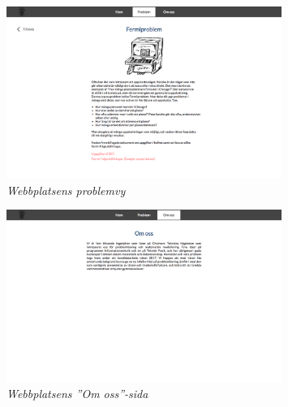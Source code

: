 \begin{figure}
\centering
\includegraphics[width=0.8\textwidth]{Figures/Webbplatsen/Webbplats-problemvy.png}
\caption{\textsl{Webbplatsens problemvy}}
\label{fig:w3}
\end{figure}

\begin{figure}
\centering
\includegraphics[width=0.8\textwidth]{Figures/Webbplatsen/Webbplats-omoss.png}
\caption{\textsl{Webbplatsens ''Om oss''-sida}}
\label{fig:w4}
\end{figure}
